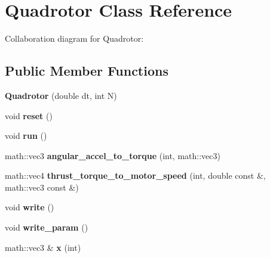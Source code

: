 \hypertarget{classQuadrotor}{
\section{Quadrotor Class Reference}
\label{classQuadrotor}
}
Collaboration diagram for Quadrotor:\subsection*{Public Member Functions}
\begin{DoxyCompactItemize}
\item 
\hypertarget{classQuadrotor_a02a4b5c132d374626be48a5d288bb795}{
{\bfseries Quadrotor} (double dt, int N)}
\label{classQuadrotor_a02a4b5c132d374626be48a5d288bb795}

\item 
\hypertarget{classQuadrotor_a1e883a0d6205ad9af214afe2b6f84d2f}{
void {\bfseries reset} ()}
\label{classQuadrotor_a1e883a0d6205ad9af214afe2b6f84d2f}

\item 
\hypertarget{classQuadrotor_a86703e4d10af125e7b34ab09711c80f9}{
void {\bfseries run} ()}
\label{classQuadrotor_a86703e4d10af125e7b34ab09711c80f9}

\item 
\hypertarget{classQuadrotor_a32c9f06143c6b1ad7eff6442fae29b03}{
math::vec3 {\bfseries angular\_\-accel\_\-to\_\-torque} (int, math::vec3)}
\label{classQuadrotor_a32c9f06143c6b1ad7eff6442fae29b03}

\item 
\hypertarget{classQuadrotor_a5ab35934cf51134d5084ee58d9aa63fe}{
math::vec4 {\bfseries thrust\_\-torque\_\-to\_\-motor\_\-speed} (int, double const \&, math::vec3 const \&)}
\label{classQuadrotor_a5ab35934cf51134d5084ee58d9aa63fe}

\item 
\hypertarget{classQuadrotor_a1c250bf48c42d7fed0f1ebc74dbc7249}{
void {\bfseries write} ()}
\label{classQuadrotor_a1c250bf48c42d7fed0f1ebc74dbc7249}

\item 
\hypertarget{classQuadrotor_ae35477027bde2e9ad10ef7ac557000a8}{
void {\bfseries write\_\-param} ()}
\label{classQuadrotor_ae35477027bde2e9ad10ef7ac557000a8}

\item 
\hypertarget{classQuadrotor_a65d4670873c532d351a8d06f8c0c79b4}{
math::vec3 \& {\bfseries x} (int)}
\label{classQuadrotor_a65d4670873c532d351a8d06f8c0c79b4}


\end{DoxyCompactItemize}
